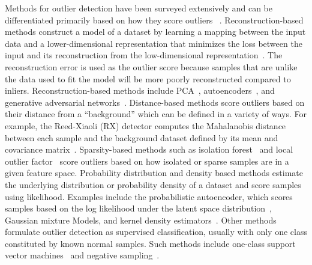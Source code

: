 \documentclass[utf8]{frontiersFPHY} %
\begin{document}
Methods for outlier detection have been 
surveyed extensively and can be differentiated primarily based on how they 
score outliers
~\cite{pimentel2014review,chandola2009anomaly,markou2003novelty,
markou2003novelty2}.
%
Reconstruction-based methods construct a model of a dataset by learning 
a mapping between the input data and a lower-dimensional representation that
minimizes the loss between the input and its reconstruction from the 
low-dimensional representation~\citep{kerner2020comparison}. The 
reconstruction error is used as the outlier score because samples
that are unlike the data used to fit the model will be more poorly 
reconstructed compared to inliers. Reconstruction-based methods
include PCA~\cite{jablonski2015principal}, 
autoencoders~\cite{richter2017safe}, and
generative adversarial networks~\cite{akcay2018ganomaly}.
%
Distance-based methods score outliers based on their distance from a
``background'' which can be defined in a variety of ways. For example,
the Reed-Xiaoli (RX) detector computes the 
Mahalanobis distance between each sample and the background dataset
defined by its mean and covariance matrix~\cite{reed1990adaptive}.
%
Sparsity-based methods such as isolation forest~\cite{liu2008isolation}
and local outlier factor~\cite{breunig2000lof}
score outliers based on how isolated or sparse samples 
are in a given feature space. 
%
Probability distribution and density based methods estimate the underlying 
distribution or probability density of a dataset and score samples using
likelihood. Examples include the probabilistic
autoencoder, which scores samples based on the log likelihood under the 
latent space distribution~\cite{bohm2020probabilistic}, Gaussian mixture 
Models, and kernel density estimators~\cite{chandola2009anomaly}. 
%
Other methods formulate outlier detection as supervised classification, 
usually with only one class constituted by 
known normal samples.
Such methods include one-class support vector 
machines~\cite{scholkopf1999support}
and negative sampling~\cite{sipple:neg-sampling20}.
\end{document}
